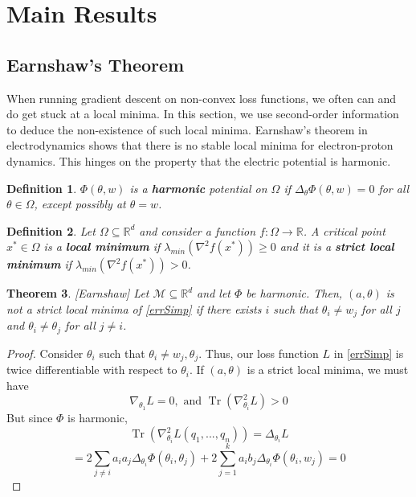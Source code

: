\documentclass{article}
\newtheorem{theorem}{Theorem}[section]
\newtheorem{definition}[theorem]{Definition}
\newcommand{\R}{{\mathbb{R}}}
\DeclareMathOperator{\Tr}{Tr}
\begin{document}
\section{Main Results} 

\subsection{Earnshaw's Theorem}

When running gradient descent on non-convex loss functions, we often can and do get stuck at a local minima. In this section, we use second-order information to deduce the non-existence of such local minima. Earnshaw's theorem in electrodynamics shows that there is no stable local minima for electron-proton dynamics. This hinges on the property that the electric potential is harmonic. 

\begin{definition}
$\Phi(\theta,w)$ is a {\bf harmonic} potential on $\Omega$ if $\Delta_\theta \Phi(\theta,w) = 0$ for all $\theta \in \Omega$, except possibly at $\theta = w$.
\end{definition}

\begin{definition}
Let $\Omega \subseteq \R^d$ and consider a function $f:\Omega \to \R$. A critical point $x^* \in \Omega$ is a {\bf local minimum} if $\lambda_{min}(\nabla^2 f(x^*)) \geq 0$ and it is a {\bf strict local minimum}  if  $\lambda_{min}(\nabla^2 f(x^*)) > 0$.
\end{definition}

\begin{theorem}\label{Earnshaw} \cite{arnold1985mathematical}[Earnshaw]
Let $\mathcal{M}\subseteq \R^d$ and let $\Phi$ be harmonic. Then, $(a,\theta)$ is not a strict local minima of \eqref{errSimp} if there exists $i$ such that $\theta_i \neq w_j$ for all $j$ and $\theta_i \neq \theta_j$ for all $j\neq i$.
\end{theorem}

\begin{proof}
Consider $\theta_i$ such that $\theta_i \neq w_j, \theta_j$. Thus, our loss function $L$ in \eqref{errSimp} is twice differentiable with respect to $\theta_i$. If $(a,\theta)$ is a strict local minima, we must have
\[\nabla_{\theta_1} L = 0, \text{ and }  \Tr(\nabla^2_{\theta_i}L) > 0\]
But since $\Phi$ is harmonic,
\[ \Tr(\nabla^2_{\theta_i}L(q_1,...,q_n)) = \Delta_{\theta_i} L\]
\[ =  2\sum_{ j\neq i} a_ia_j \Delta_{\theta_i}\Phi(\theta_i,\theta_j) + 2\sum_{j=1}^ka_ib_j  \Delta_{\theta_i}\Phi(\theta_i,w_j) = 0\]
\end{proof}
\end{document}
